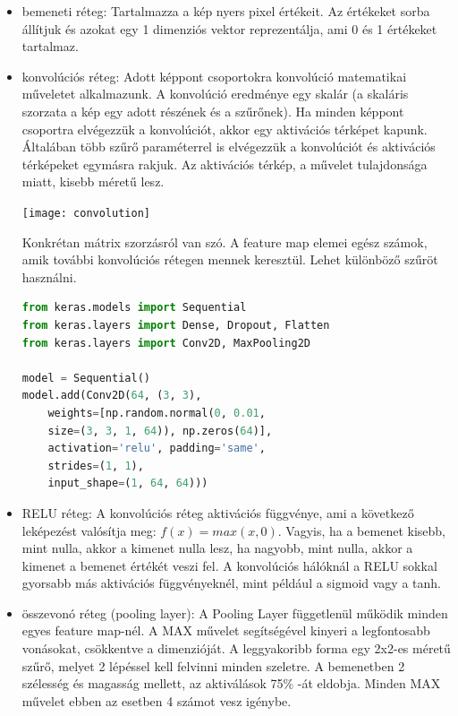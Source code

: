 \begin{itemize}
\item bemeneti réteg: Tartalmazza a kép nyers pixel értékeit. Az értékeket sorba állítjuk és azokat egy 1 dimenziós vektor reprezentálja, ami 0 és 1 értékeket tartalmaz.

\item konvolúciós réteg: Adott képpont csoportokra konvolúció matematikai műveletet alkalmazunk. A konvolúció eredménye egy skalár (a skaláris szorzata a kép egy adott részének és a szűrőnek). Ha minden képpont csoportra elvégezzük a konvolúciót, akkor egy aktivációs térképet kapunk. Általában több szűrő paraméterrel is elvégezzük a konvolúciót és aktivációs térképeket egymásra rakjuk. Az aktivációs térkép, a művelet tulajdonsága miatt, kisebb
méretű lesz.

\begin{center}
\texttt{[image: convolution]}
\end{center}

Konkrétan mátrix szorzásról van szó. A feature map elemei egész számok, amik további konvolúciós rétegen mennek keresztül. Lehet különböző szűröt használni.
\begin{lstlisting}[language=Python]
from keras.models import Sequential
from keras.layers import Dense, Dropout, Flatten
from keras.layers import Conv2D, MaxPooling2D

model = Sequential()
model.add(Conv2D(64, (3, 3),
	weights=[np.random.normal(0, 0.01,
	size=(3, 3, 1, 64)), np.zeros(64)],
	activation='relu', padding='same',
	strides=(1, 1),
	input_shape=(1, 64, 64)))
\end{lstlisting}

\item RELU réteg: A konvolúciós réteg aktivációs függvénye, ami a következő leképezést valósítja meg: \(f(x) = max(x, 0)\). Vagyis, ha a bemenet kisebb, mint nulla, akkor a kimenet nulla lesz, ha nagyobb, mint nulla, akkor a kimenet a bemenet értékét veszi fel. A konvolúciós hálóknál a RELU sokkal gyorsabb más aktivációs függvényeknél, mint például a sigmoid vagy a tanh.
\item összevonó réteg (pooling layer): A Pooling Layer függetlenül működik minden egyes feature map-nél. A MAX művelet segítségével kinyeri a legfontosabb vonásokat, csökkentve a dimenzióját. A leggyakoribb forma egy 2x2-es méretű szűrő, melyet 2 lépéssel kell felvinni minden szeletre. A bemenetben 2 szélesség és magasság mellett, az aktiválások 75\% -át eldobja. Minden MAX művelet ebben az esetben 4 számot vesz igénybe.


\end{itemize}
